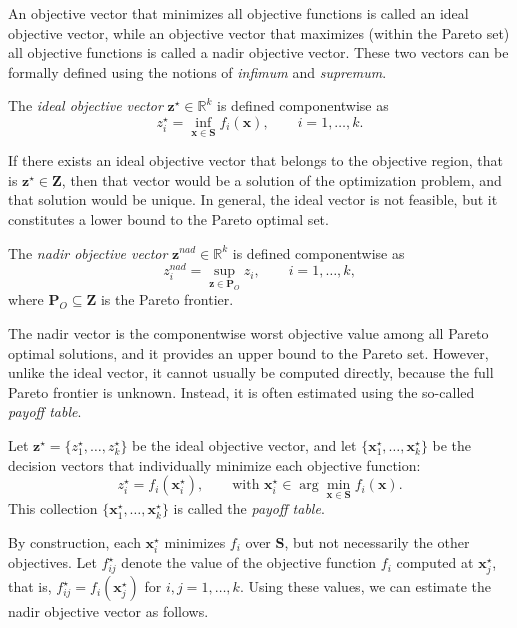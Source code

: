 An objective vector that minimizes all objective functions is called an ideal objective vector, while an objective vector that maximizes (within the Pareto set) all objective functions is called a nadir objective vector. These two vectors can be formally defined using the notions of \emph{infimum} and \emph{supremum}.

\begin{definition}
The \emph{ideal objective vector} $\mathbf{z}^\star \in \mathbb{R}^k$ is defined componentwise as
\[
z^\star_i = \inf_{\mathbf{x} \in \mathbf{S}} f_i(\mathbf{x}), \qquad i = 1,\ldots,k.
\]
\end{definition}

If there exists an ideal objective vector that belongs to the objective region, that is $\mathbf{z}^\star \in \mathbf{Z}$, then that vector would be a solution of the optimization problem, and that solution would be unique. In general, the ideal vector is not feasible, but it constitutes a lower bound to the Pareto optimal set.

\begin{definition}
The \emph{nadir objective vector} $\mathbf{z}^{nad} \in \mathbb{R}^k$ is defined componentwise as
\[
z^{nad}_i = \sup_{\mathbf{z} \in \mathbf{P}_O} z_i, \qquad i = 1,\ldots,k,
\]
where $\mathbf{P}_O \subseteq \mathbf{Z}$ is the Pareto frontier.
\end{definition}

The nadir vector is the componentwise worst objective value among all Pareto optimal solutions, and it provides an upper bound to the Pareto set. However, unlike the ideal vector, it cannot usually be computed directly, because the full Pareto frontier is unknown. Instead, it is often estimated using the so-called \emph{payoff table}.

\begin{definition}
Let $\mathbf{z}^\star = \{ z^\star_1, \ldots, z^\star_k \}$ be the ideal objective vector, and let $\{ \mathbf{x}^\star_1, \ldots, \mathbf{x}^\star_k \}$ be the decision vectors that individually minimize each objective function:
\[
z^\star_i = f_i(\mathbf{x}^\star_i), \qquad \text{with } \mathbf{x}^\star_i \in \arg\min_{\mathbf{x}\in\mathbf{S}} f_i(\mathbf{x}).
\]
This collection $\{ \mathbf{x}^\star_1, \ldots, \mathbf{x}^\star_k \}$ is called the \emph{payoff table}.
\end{definition}

By construction, each $\mathbf{x}^\star_i$ minimizes $f_i$ over $\mathbf{S}$, but not necessarily the other objectives. Let $f^\star_{ij}$ denote the value of the objective function $f_i$ computed at $\mathbf{x}^\star_j$, that is, $f^\star_{ij} = f_i(\mathbf{x}^\star_j)$ for $i,j = 1,\ldots,k$. Using these values, we can estimate the nadir objective vector as follows.

